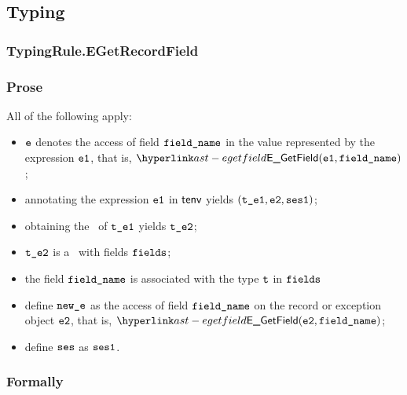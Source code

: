 \subsection{Typing}
\subsubsection{TypingRule.EGetRecordField\label{sec:TypingRule.EGetRecordField}}
\subsubsection{Prose}
All of the following apply:
\begin{itemize}
  \item $\ve$ denotes the access of field $\fieldname$ in the value represented by the expression $\veone$, that is, $\EGetField(\veone, \fieldname)$;
  \item annotating the expression $\veone$ in $\tenv$ yields $(\vteone, \vetwo, \vsesone)$\ProseOrTypeError;
  \item obtaining the \underlyingtype\ of $\vteone$ yields $\vtetwo$\ProseOrTypeError;
  \item $\vtetwo$ is a \structuredtype\ with fields $\fields$;
  \item the field $\fieldname$ is associated with the type $\vt$ in $\fields$
  \item define $\newe$ as the access of field $\fieldname$ on the record or exception object $\vetwo$, that is, $\EGetField(\vetwo, \fieldname)$;
  \item define $\vses$ as $\vsesone$.
\end{itemize}
\subsubsection{Formally}
\begin{mathpar}
\end{mathpar}

